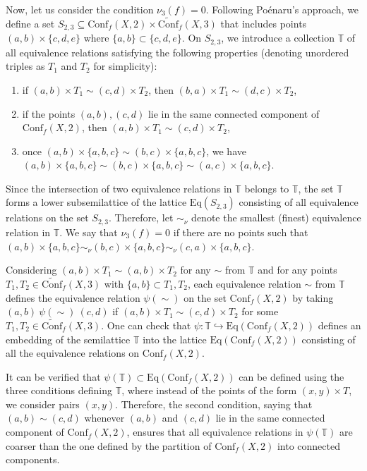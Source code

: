 \documentclass[a4paper,12pt,reqno,oneside]{amsart}
\theoremstyle{plain}
\theoremstyle{definition}
\theoremstyle{plain}
\newcommand{\from}{\colon}
\newcommand{\wt}[1]{\widetilde{#1}}
\newcommand{\Conf}{\mathrm{Conf}}
\newcommand{\TT}{\mathbb{T}}
\newcommand{\Eq}{\mathrm{Eq}}
\begin{document}
Now, let us consider the condition $\nu_3(f) = 0$. Following Po\'{e}naru's approach, we define a set
$S_{2,3} \subseteq \Conf_f(X, 2) \times \wt{\Conf}_f(X, 3)$ that includes points
$(a, b) \times \{c, d, e\}$ where $\{a, b\} \subset \{c, d, e\}$. On $S_{2,3}$, we introduce a
collection $\TT$ of all equivalence relations satisfying the following properties (denoting
unordered triples as $T_1$ and $T_2$ for simplicity):
\begin{enumerate}
\item if $(a, b) \times T_1 \sim (c, d) \times T_2$, then $(b, a) \times T_1 \sim (d, c) \times T_2$,
\item if the points $(a, b), (c, d)$ lie in the same connected component of $\Conf_f(X, 2)$, then
  $(a, b) \times T_1 \sim (c, d) \times T_2$,
\item once $(a, b) \times \{a, b, c\} \sim (b, c) \times \{a, b, c\}$, we have $(a, b) \times \{a, b,
  c\} \sim (b, c) \times \{a, b, c\} \sim (a, c) \times \{a, b, c\}$.
\end{enumerate}

Since the intersection of two equivalence relations in $\TT$ belongs to $\TT$, the set $\TT$ forms a
lower subsemilattice of the lattice $\Eq(S_{2,3})$ consisting of all equivalence relations on the
set $S_{2,3}$. Therefore, let $\sim_\nu$ denote the smallest (finest) equivalence relation in
$\mathbb{T}$. We say that $\nu_3(f) = 0$ if there are no points such that
$(a, b) \times \{a, b, c\} \sim_\nu (b, c) \times \{a, b, c\} \sim_\nu (c, a) \times \{a, b, c\}$.

Considering $(a, b) \times T_1 \sim (a, b) \times T_2$ for any $\sim$ from $\TT$ and for any points
$T_1, T_2 \in \wt{\Conf}_f(X, 3)$ with $\{a, b\} \subset T_{1}, T_{2}$, each equivalence relation
$\sim$ from $\TT$ defines the equivalence relation $\psi(\sim)$ on the set $\Conf_f(X, 2)$ by taking
$(a, b)\ \psi(\sim)\ (c, d)$ if $(a, b) \times T_1 \sim (c, d) \times T_2$ for some
$T_1, T_2 \in \wt{\Conf}_f(X, 3)$. One can check that
$\psi \from \TT \hookrightarrow \Eq(\Conf_f(X, 2))$ defines an embedding of the semilattice $\TT$
into the lattice $\Eq(\Conf_f(X, 2))$ consisting of all the equivalence relations on
$\Conf_f(X, 2)$.

It can be verified that $\psi(\TT) \subset \Eq(\Conf_f(X, 2))$ can be defined using the three
conditions defining $\TT$, where instead of the points of the form $(x, y) \times T$, we consider
pairs $(x, y)$. Therefore, the second condition, saying that $(a, b) \sim (c, d)$ whenever $(a, b)$ and $(c,
d)$ lie in the same connected component of $\Conf_f(X, 2)$, ensures that all equivalence relations
in $\psi(\TT)$ are coarser than the one defined by the partition of $\Conf_f(X, 2)$ into connected
components.
\end{document}
